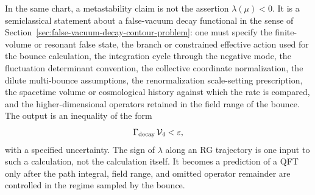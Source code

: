 \begin{definition}
\label{def:sm-metastability-statement}
In the same chart, a metastability claim is not the assertion
\(\lambda(\mu)<0\).  It is a semiclassical statement about a
false-vacuum decay functional in the sense of
Section~\ref{sec:false-vacuum-decay-contour-problem}: one must specify the
finite-volume or resonant false state, the branch or constrained effective
action used for the bounce calculation, the integration cycle through the
negative mode, the fluctuation determinant convention, the collective
coordinate normalization, the dilute multi-bounce assumptions, the
renormalization scale-setting prescription, the spacetime volume or
cosmological history against which the rate is compared, and the
higher-dimensional operators retained in the field range of the bounce.  The
output is an inequality of the form
\begin{equation}
  \Gamma_{\rm decay}\,{\mathcal V}_4 < \varepsilon ,
  \label{eq:sm-metastability-rate-statement}
\end{equation}
with a specified uncertainty.  The sign of \(\lambda\) along an RG trajectory
is one input to such a calculation, not the calculation itself.  It becomes a
prediction of a QFT only after the path integral, field range, and omitted
operator remainder are controlled in the regime sampled by the bounce.
\end{definition}

